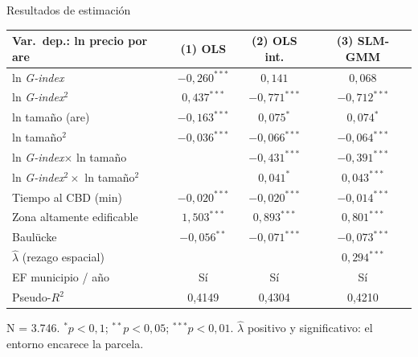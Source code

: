 \documentclass[11pt,aspectratio=169]{beamer}
\newcommand{\Gindex}{\textit{G-index}\xspace}
\begin{document}
\begin{frame}{Resultados de estimación}
  \centering
  \begin{table}\scriptsize
  \begin{tabular}{lccc}
    \toprule
    Var.\ dep.: ln precio por are & (1) OLS & (2) OLS int. & (3) SLM-GMM \\
    \midrule
    ln \Gindex & $-0{,}260^{***}$ & $0{,}141$ & $0{,}068$ \\
    ln \Gindex$^2$ & $0{,}437^{***}$ & $-0{,}771^{***}$ & $-0{,}712^{***}$ \\
    ln tamaño (are) & $-0{,}163^{***}$ & $0{,}075^{*}$ & $0{,}074^{*}$ \\
    ln tamaño$^2$ & $-0{,}036^{***}$ & $-0{,}066^{***}$ & $-0{,}064^{***}$ \\
    ln \Gindex $\times$ ln tamaño & & $-0{,}431^{***}$ & $-0{,}391^{***}$ \\
    ln \Gindex$^2 \times$ ln tamaño$^2$ & & $0{,}041^{*}$ & $0{,}043^{***}$ \\
    \midrule
    Tiempo al CBD (min) & $-0{,}020^{***}$ & $-0{,}020^{***}$ & $-0{,}014^{***}$ \\
    Zona altamente edificable & $1{,}503^{***}$ & $0{,}893^{***}$ & $0{,}801^{***}$ \\
    Baulücke & $-0{,}056^{**}$ & $-0{,}071^{***}$ & $-0{,}073^{***}$ \\
    \midrule
    $\hat\lambda$ (rezago espacial) & & & $0{,}294^{***}$ \\
    EF municipio / año & Sí & Sí & Sí \\
    Pseudo-$R^2$ & 0,4149 & 0,4304 & 0,4210 \\
    \bottomrule
  \end{tabular}
  \end{table}
  \vspace{0.2em}
  \scriptsize N = 3.746. $^{*}p<0{,}1$; $^{**}p<0{,}05$; $^{***}p<0{,}01$. $\hat\lambda$ positivo y significativo: el entorno encarece la parcela.
\end{frame}
\end{document}
